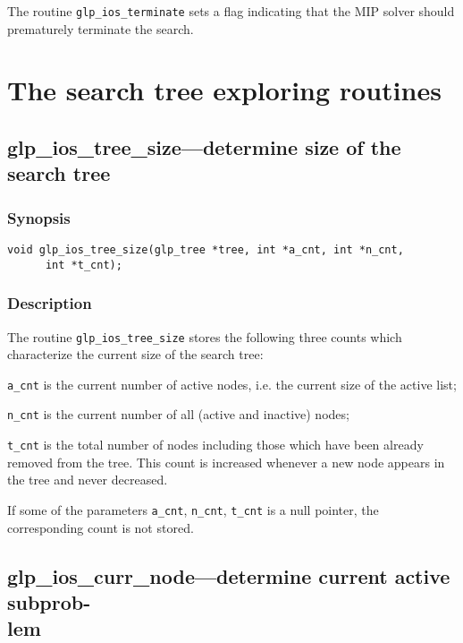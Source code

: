 The routine \verb|glp_ios_terminate| sets a flag indicating that the
MIP solver should prematurely terminate the search.


\newpage

\section{The search tree exploring routines}

\subsection{glp\_ios\_tree\_size---determine size of the search tree}

\subsubsection*{Synopsis}

\begin{verbatim}
void glp_ios_tree_size(glp_tree *tree, int *a_cnt, int *n_cnt,
      int *t_cnt);
\end{verbatim}

\subsubsection*{Description}

The routine \verb|glp_ios_tree_size| stores the following three counts
which characterize the current size of the search tree:

\verb|a_cnt| is the current number of active nodes, i.e. the current
size of the active list;

\verb|n_cnt| is the current number of all (active and inactive) nodes;

\verb|t_cnt| is the total number of nodes including those which have
been already removed from the tree. This count is increased whenever
a new node appears in the tree and never decreased.

If some of the parameters \verb|a_cnt|, \verb|n_cnt|, \verb|t_cnt| is
a null pointer, the corresponding count is not stored.

\subsection{glp\_ios\_curr\_node---determine current active subprob-\\
lem}

